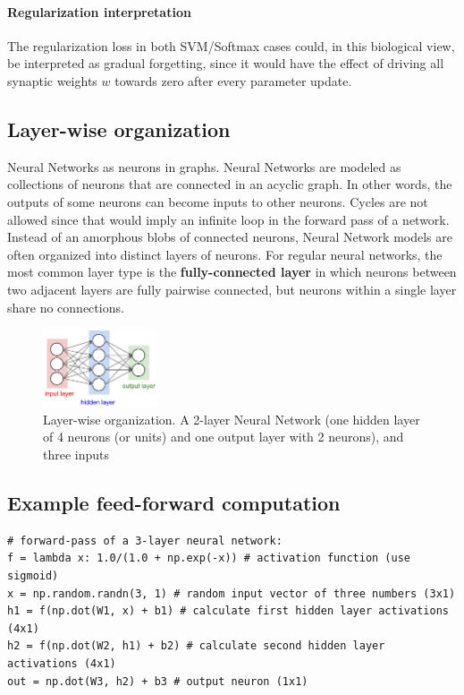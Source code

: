 \paragraph*{Regularization interpretation} The regularization loss in both SVM/Softmax cases could, in this biological view, be interpreted as gradual forgetting, since it would have the effect of driving all synaptic weights $w$ towards zero after every parameter update.

\subsection*{Layer-wise organization}
Neural Networks as neurons in graphs. Neural Networks are modeled as collections of neurons that are connected in an acyclic graph. In other words, the outputs of some neurons can become inputs to other neurons. Cycles are not allowed since that would imply an infinite loop in the forward pass of a network. Instead of an amorphous blobs of connected neurons, Neural Network models are often organized into distinct layers of neurons. For regular neural networks, the most common layer type is the \textbf{fully-connected layer} in which neurons between two adjacent layers are fully pairwise connected, but neurons within a single layer share no connections. 

\begin{figure}[h]
  \centering
  \includegraphics[width=0.3\textwidth]{Images/nn/2.jpeg}
  \caption{Layer-wise organization. A 2-layer Neural Network (one hidden layer of 4 neurons (or units) and one output layer with 2 neurons), and three inputs}
\end{figure}

\subsection*{Example feed-forward computation}
\begin{lstlisting}[frame=single]
# forward-pass of a 3-layer neural network:
f = lambda x: 1.0/(1.0 + np.exp(-x)) # activation function (use sigmoid)
x = np.random.randn(3, 1) # random input vector of three numbers (3x1)
h1 = f(np.dot(W1, x) + b1) # calculate first hidden layer activations (4x1)
h2 = f(np.dot(W2, h1) + b2) # calculate second hidden layer activations (4x1)
out = np.dot(W3, h2) + b3 # output neuron (1x1)
\end{lstlisting}


